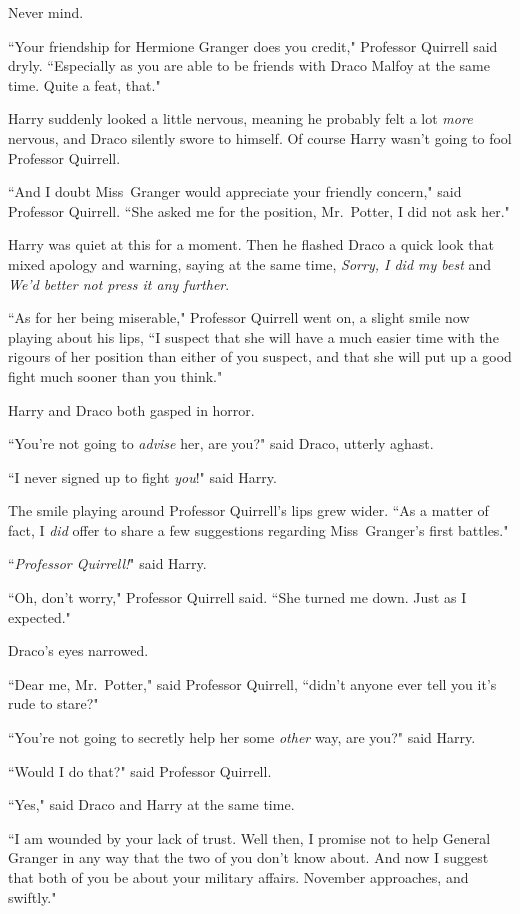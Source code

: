 Never mind.

``Your friendship for Hermione Granger does you credit," Professor Quirrell said dryly. ``Especially as you are able to be friends with Draco Malfoy at the same time. Quite a feat, that."

Harry suddenly looked a little nervous, meaning he probably felt a lot \emph{more} nervous, and Draco silently swore to himself. Of course Harry wasn't going to fool Professor Quirrell.

``And I doubt Miss~Granger would appreciate your friendly concern," said Professor Quirrell. ``She asked me for the position, Mr.~Potter, I did not ask her."

Harry was quiet at this for a moment. Then he flashed Draco a quick look that mixed apology and warning, saying at the same time, \emph{Sorry, I did my best} and \emph{We'd better not press it any further}.

``As for her being miserable," Professor Quirrell went on, a slight smile now playing about his lips, ``I suspect that she will have a much easier time with the rigours of her position than either of you suspect, and that she will put up a good fight much sooner than you think."

Harry and Draco both gasped in horror.

``You're not going to \emph{advise} her, are you?" said Draco, utterly aghast.

``I never signed up to fight \emph{you}!" said Harry.

The smile playing around Professor Quirrell's lips grew wider. ``As a matter of fact, I \emph{did} offer to share a few suggestions regarding Miss~Granger's first battles."

``\emph{Professor Quirrell!}" said Harry.

``Oh, don't worry," Professor Quirrell said. ``She turned me down. Just as I expected."

Draco's eyes narrowed.

``Dear me, Mr.~Potter," said Professor Quirrell, ``didn't anyone ever tell you it's rude to stare?"

``You're not going to secretly help her some \emph{other} way, are you?" said Harry.

``Would I do that?" said Professor Quirrell.

``Yes," said Draco and Harry at the same time.

``I am wounded by your lack of trust. Well then, I promise not to help General Granger in any way that the two of you don't know about. And now I suggest that both of you be about your military affairs. November approaches, and swiftly."

